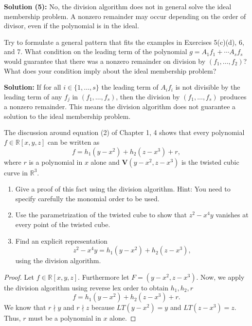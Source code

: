 \textbf{Solution (5):} No, the division algorithm does not in general solve the ideal membership problem. 
A nonzero remainder may occur depending on the order of divisor, even if the polynomial is in the ideal. 

\begin{tcolorbox}[title=Problem 8, breakable]
    Try to formulate a general pattern that fits the examples in 
    Exercises 5(c)(d), 6, and 7.
    What condition on the leading term of the polynomial 
    $g = A_1 f_1  + \cdots A_s f_s$ would guarantee that there was 
    a nonzero remainder on division by $(f_1, \ldots, f_2)$?
    What does your condition imply about the ideal membership problem?
\end{tcolorbox}

\textbf{Solution: }
If for all $i \in \{1, \ldots, s\}$ the leading term of $A_i f_i$ is not divisible by the leading term of any $f_j$ in $(f_1, \ldots, f_s)$, 
then the division by $(f_1, \ldots, f_s)$ produces a nonzero remainder.  
This means the division algorithm does not guarantee a solution to the ideal membership problem.

\begin{tcolorbox}[title=Problem 9, breakable]
    The discussion around equation (2) of Chapter 1, 4 shows that every
    polynomial $f \in \mathbb{R}[x, y, z]$ can be written as 
    \[f = h_1(y - x^2) + h_2(z - x^3) + r,\]
    where $r$ is a polynomial in $x$ alone and $\textbf{V}(y - x^2, z - x^3)$ is the twisted cubic curve in $\mathbb{R}^3$.
    \begin{enumerate}
        \item Give a proof of this fact using the division algorithm.
        Hint: You need to specify carefully the monomial order to be used.
        \item Use the parametrization of the twisted cube to show that $z^2 - x^4 y$
        vanishes at every point of the twisted cube.
        \item Find an explicit representation
        \[z^2 - x^4 y = h_1(y - x^2) + h_2(z - x^3),\]
        using the division algorithm.
    \end{enumerate}
\end{tcolorbox}

\begin{proof}
    Let $f \in \mathbb{R}[x, y, z]$.
    Furthermore let $F = (y - x^2, z - x^3)$.
    Now, we apply the division algorithm using reverse lex order to obtain $h_1, h_2, r$
    \[f = h_1(y - x^2) + h_2(z - x^3) + r.\]
    We know that $r \nmid y$ and $r \nmid z$ because $LT(y - x^2) = y$
        and $LT(z - x^3) = z$. 
    Thus, $r$ must be a polynomial in $x$ alone.
\end{proof}

